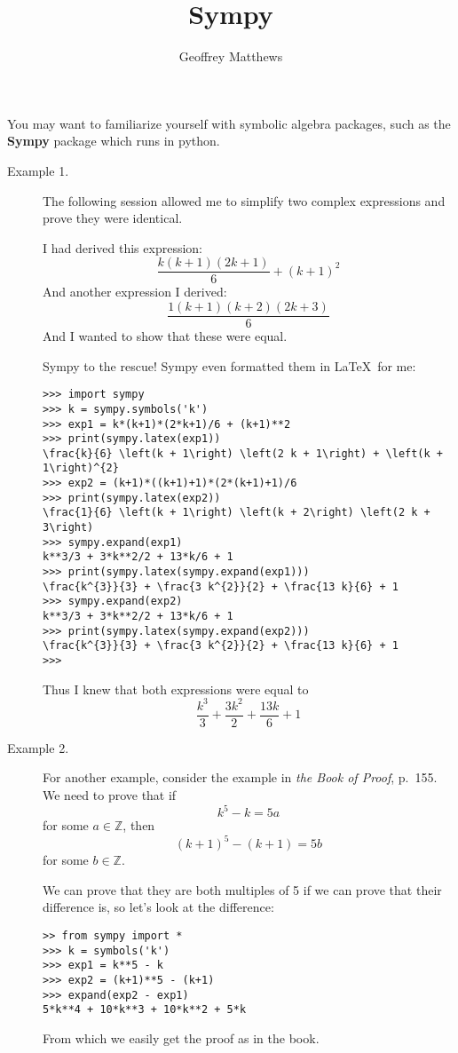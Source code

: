 \documentclass{article}
\title{Sympy}
\author{Geoffrey Matthews}
\begin{document}
\maketitle
  You may want to familiarize yourself with symbolic algebra packages,
  such as the {\bf Sympy} package which runs in python.

  \begin{description}
    \item[Example 1.] The following
  session allowed me to simplify two complex expressions
  and prove they were identical.

  I had derived this expression:
  \[
  \frac{k \left(k + 1\right) \left(2 k + 1\right)}{6} + \left(k + 1\right)^{2}
  \]
  And another expression I derived:
  \[
\frac{1 \left(k + 1\right) \left(k + 2\right) \left(2 k + 3\right)}{6}
\]
And I wanted to show that these were equal.

Sympy to the rescue!  
  Sympy even formatted them in \LaTeX\ for me:
  \begin{Verbatim}[frame=single]
>>> import sympy
>>> k = sympy.symbols('k')
>>> exp1 = k*(k+1)*(2*k+1)/6 + (k+1)**2
>>> print(sympy.latex(exp1))
\frac{k}{6} \left(k + 1\right) \left(2 k + 1\right) + \left(k + 1\right)^{2}
>>> exp2 = (k+1)*((k+1)+1)*(2*(k+1)+1)/6
>>> print(sympy.latex(exp2))
\frac{1}{6} \left(k + 1\right) \left(k + 2\right) \left(2 k + 3\right)
>>> sympy.expand(exp1)
k**3/3 + 3*k**2/2 + 13*k/6 + 1
>>> print(sympy.latex(sympy.expand(exp1)))
\frac{k^{3}}{3} + \frac{3 k^{2}}{2} + \frac{13 k}{6} + 1
>>> sympy.expand(exp2)
k**3/3 + 3*k**2/2 + 13*k/6 + 1
>>> print(sympy.latex(sympy.expand(exp2)))
\frac{k^{3}}{3} + \frac{3 k^{2}}{2} + \frac{13 k}{6} + 1
>>> 
 \end{Verbatim}
  Thus I knew that both expressions were equal to
  \[
  \frac{k^{3}}{3} + \frac{3 k^{2}}{2} + \frac{13 k}{6} + 1
  \]

  \newpage


\item[Example 2.]
  For another example,
consider the example in {\em the Book of Proof}, p.~155. We need
to prove that if \[k^5 - k = 5a\] for some $a\in\mathbb{Z}$, then
\[(k+1)^5 - (k+1) = 5b\] for some $b\in\mathbb{Z}$.

We can prove that
they are both multiples of 5 if we can prove that 
their difference is, so let's look at the difference:
\begin{Verbatim}[frame=single]
>> from sympy import *
>>> k = symbols('k')
>>> exp1 = k**5 - k
>>> exp2 = (k+1)**5 - (k+1) 
>>> expand(exp2 - exp1)
5*k**4 + 10*k**3 + 10*k**2 + 5*k
\end{Verbatim}
From which we easily get the proof as in the book.  


\end{description}
\end{document}
